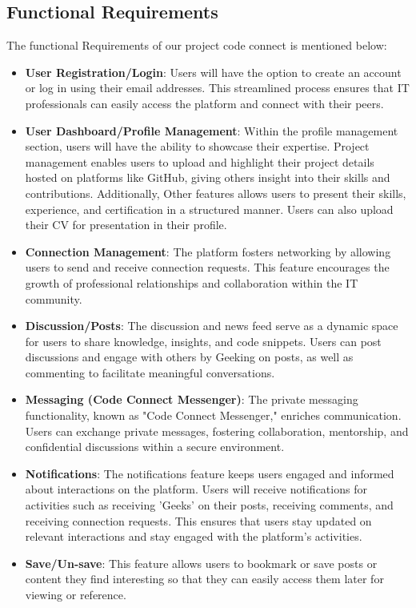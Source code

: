 \subsection{Functional Requirements}
The functional Requirements of our project code connect is mentioned below:
\begin{itemize}
    \item \textbf{User Registration/Login}:
      Users will have the option to create an account or log in using their email addresses. This streamlined process ensures that IT professionals can easily access the platform and connect with their peers.
    \item \textbf{User Dashboard/Profile Management}:
      Within the profile management section, users will have the ability to showcase their expertise. Project management enables users to upload and highlight their project details hosted on platforms like GitHub, giving others insight into their skills and contributions. Additionally, Other features allows users to present their skills, experience, and certification in a structured manner. Users can also upload their CV for presentation in their profile.
    \item \textbf{Connection Management}:
      The platform fosters networking by allowing users to send and receive connection requests. This feature encourages the growth of professional relationships and collaboration within the IT community.
    \item \textbf{Discussion/Posts}:
      The discussion and news feed serve as a dynamic space for users to share knowledge, insights, and code snippets. Users can post discussions and engage with others by Geeking on posts, as well as commenting to facilitate meaningful conversations.
    \item \textbf{Messaging (Code Connect Messenger)}:
      The private messaging functionality, known as "Code Connect Messenger," enriches communication. Users can exchange private messages, fostering collaboration, mentorship, and confidential discussions within a secure environment.
    \item \textbf{Notifications}:
      The notifications feature keeps users engaged and informed about interactions on the platform. Users will receive notifications for activities such as receiving 'Geeks' on their posts, receiving comments, and receiving connection requests. This ensures that users stay updated on relevant interactions and stay engaged with the platform's activities.
    \item \textbf{Save/Un-save}:
      This feature allows users to bookmark or save posts or content they find interesting so that they can easily access them later for viewing or reference.


\end{itemize}
